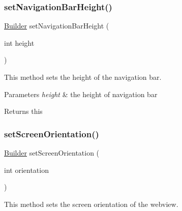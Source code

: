 \subsubsection{\texorpdfstring{set\+Navigation\+Bar\+Height()}{setNavigationBarHeight()}}
{\footnotesize\ttfamily \hyperlink{classcom_1_1toast_1_1android_1_1gamebase_1_1_gamebase_web_view_configuration_1_1_builder}{Builder} set\+Navigation\+Bar\+Height (\begin{DoxyParamCaption}\item[{int}]{height }\end{DoxyParamCaption})}



This method sets the height of the navigation bar. 


\begin{DoxyParams}{Parameters}
{\em height} & the height of navigation bar \\
\hline
\end{DoxyParams}
\begin{DoxyReturn}{Returns}
this 
\end{DoxyReturn}
\mbox{\label{classcom_1_1toast_1_1android_1_1gamebase_1_1_gamebase_web_view_configuration_1_1_builder_a3bbc9a0a9538f529b1ab1ab4dda8669f}} 
\subsubsection{\texorpdfstring{set\+Screen\+Orientation()}{setScreenOrientation()}}
{\footnotesize\ttfamily \hyperlink{classcom_1_1toast_1_1android_1_1gamebase_1_1_gamebase_web_view_configuration_1_1_builder}{Builder} set\+Screen\+Orientation (\begin{DoxyParamCaption}\item[{int}]{orientation }\end{DoxyParamCaption})}



This method sets the screen orientation of the webview. 


